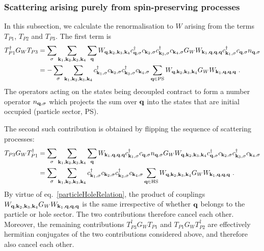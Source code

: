 \documentclass[reprint,hidelinks,onecolumn]{revtex4-2}
\begin{document}
\subsubsection*{Scattering arising purely from spin-preserving processes}
In this subsection, we calculate the renormalisation to \(W\) arising from the terms \(T_{P1}\), \(T_{P2}\) and \(T_{P3}\). The first term is
\begin{equation}\begin{aligned}
	T_{P1}^\dagger G_W T_{P3} &= \sum_\sigma\sum_{{\bf k}_1, {\bf k}_2, {\bf k}_3, {\bf k}_4} \sum_{\bf q} W_{{\bf q},{\bf k}_2,{\bf k}_3,{\bf k}_4}c^\dagger_{{\bf q},\sigma}c_{{\bf k}_2,\sigma}c^\dagger_{{\bf k}_3,\sigma}c_{{\bf k}_4,\sigma} G_W W_{{\bf k}_1,{\bf q},{\bf q},{\bf q}} c^\dagger_{{\bf k}_1,\sigma}c_{{\bf q},\sigma} n_{{\bf q},\sigma}\\
							  &= -\sum_\sigma\sum_{{\bf k}_1, {\bf k}_2, {\bf k}_3, {\bf k}_4} c^\dagger_{{\bf k}_1,\sigma} c_{{\bf k}_2,\sigma}c^\dagger_{{\bf k}_3,\sigma}c_{{\bf k}_4,\sigma} \sum_{\bf q \in \text{PS}} W_{{\bf q},{\bf k}_2,{\bf k}_3,{\bf k}_4} G_W W_{{\bf k}_1,{\bf q},{\bf q},{\bf q}}~.
\end{aligned}\end{equation}
The operators acting on the states being decoupled contract to form a number operator \(n_{{\bf q},\sigma}\) which projects the sum over \({\bf q}\) into the states that are initial occupied (particle sector, PS). 

The second such contribution is obtained by flipping the sequence of scattering processes:
\begin{equation}\begin{aligned}
	T_{P3} G_W T_{P1}^\dagger &= \sum_\sigma\sum_{{\bf k}_1, {\bf k}_2, {\bf k}_3, {\bf k}_4} \sum_{\bf q} W_{{\bf k}_1,{\bf q},{\bf q},{\bf q}} c^\dagger_{{\bf k}_1,\sigma}c_{{\bf q},\sigma} n_{{\bf q},\sigma} G_W W_{{\bf q},{\bf k}_2,{\bf k}_3,{\bf k}_4}c^\dagger_{{\bf q},\sigma}c_{{\bf k}_2,\sigma}c^\dagger_{{\bf k}_3,\sigma}c_{{\bf k}_4,\sigma} \\
							  &= \sum_\sigma\sum_{{\bf k}_1, {\bf k}_2, {\bf k}_3, {\bf k}_4} c^\dagger_{{\bf k}_1,\sigma} c_{{\bf k}_2,\sigma}c^\dagger_{{\bf k}_3,\sigma}c_{{\bf k}_4,\sigma} \sum_{\bf q \in \text{HS}} W_{{\bf q},{\bf k}_2,{\bf k}_3,{\bf k}_4} G_W W_{{\bf k}_1,{\bf q},{\bf q},{\bf q}}~.
\end{aligned}\end{equation}
By virtue of eq.~\ref{particleHoleRelation}, the product of couplings \(W_{{\bf q},{\bf k}_2,{\bf k}_3,{\bf k}_4} G_W W_{{\bf k}_1,{\bf q},{\bf q},{\bf q}}\) is the same irrespective of whether \({\bf q}\) belongs to the particle or hole sector. The two contributions therefore cancel each other. Moreover, the remaining contributions \(T_{P3}^\dagger G_W T_{P1}\) and \(T_{P1}G_W T_{P2}^\dagger\) are effectively hermitian conjugates of the two contributions considered above, and therefore also cancel each other.
\end{document}
